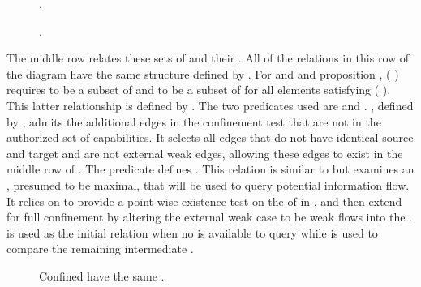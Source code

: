 \begin{figure}
  \COQDOCsubsetEqAgSimplyConfined{}
  \COQDOCagSimplyConfined{}
  \COQDOCsubsetEqPred{}
  \COQDOCsubsetPred{}
  \caption{\xmakefirstuc{\TMagSimplyConfined}.\label{fig:confinement:agSimplyConfined}}
\end{figure}

\begin{figure}
  \COQDOCsubsetEqAgConfined{}
  \COQDOCagConfined{}
  \COQDOCagExFlow{}
  \COQDOCagFlow{}
  \COQDOCsubsetEqAgSimplyConfinedAgConfined{}
  \caption{\xmakefirstuc{\TMagConfined}.\label{fig:confinement:agConfined}}
\end{figure}


The middle row relates these sets of \TMaccessGraphs{} and their \TMmutability{}.
All of the relations in this row of the diagram have the same structure defined by \COQsubsetEqPred{}.
For \TMaccessGraphs{}  and  and proposition , (\COQsubsetEqPred{}   ) requires  to be a subset of  and  to be a subset of  for all elements satisfying (  ).
This latter relationship is defined by \COQsubsetPred{}.
The two predicates used are \term{\TMagSimpleConfinement} and \term{\TMagConfinement}.
\Term{\TMagSimpleConfinement}, defined by \COQagSimplyConfined{}, admits the additional edges in the confinement test that are not in the authorized set of capabilities.
It selects all edges that do not have identical source and target and are not external weak edges, allowing these edges to exist in the middle row of .
The predicate \COQagConfined{} defines \term{\TMagConfined}.
This relation is similar to \COQagSimplyConfined{} but examines an \TMaccessGraph{}, presumed to be maximal, that will be used to query potential information flow.
It relies on \COQagExFlow{} to provide a point-wise existence test on the \TMmutability{} of \TMsubsystem{}  in \TMaccessGraph{} , and then extend \TMagSimpleConfinement{} for full confinement by altering the external weak case to be weak flows into the \TMsubsystem{}.
\xmakefirstuc{\TMagSimplyConfined} is used as the initial relation when no \TMpotAccAG{} is available to query while \TMagConfined{} is used to compare the remaining intermediate \TMaccessGraphs{}.

\begin{figure}
  \COQDOCsubsetEqAgConfinedMutable
  \caption{Confined \TMaccessGraphs{} have the same \TMmutability{}.\label{fig:confinement:subsetEqAgConfinedMutable}}
\end{figure}

